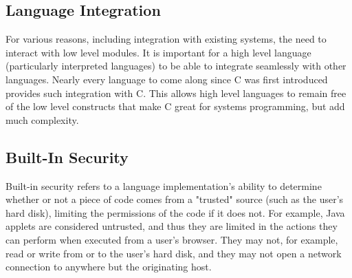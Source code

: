\documentclass[12pt,a4paper,final,twoside,onecolumn,titlepage]{book}
\begin{document}
\subsection{Language Integration}
For various reasons, including integration with existing systems, the need to interact with low level modules. It is important for a high level language (particularly interpreted languages) to be able to integrate seamlessly with other languages. Nearly every language to come along since C was first introduced provides such integration with C. This allows high level languages to remain free of the low level constructs that make C great for systems programming, but add much complexity.

\subsection{Built-In Security}
Built-in security refers to a language implementation's ability to determine whether or not a piece of code comes from a "trusted" source (such as the user's hard disk), limiting the permissions of the code if it does not. For example, Java applets are considered untrusted, and thus they are limited in the actions they can perform when executed from a user's browser. They may not, for example, read or write from or to the user's hard disk, and they may not open a network connection to anywhere but the originating host.
\end{document}

